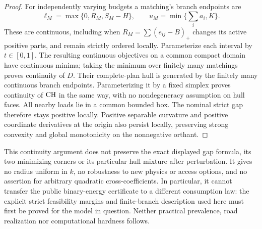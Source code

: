 \begin{proof}
For independently varying budgets a matching's branch endpoints are
\[
 \ell_M=\max\{0,R_M,S_M-H\},\qquad
 u_M=\min\{\textstyle\sum_i a_i,K\}.
\]
These are continuous, including when
$R_M=\sum(e_{ij}-B)_+$ changes its active positive parts, and remain
strictly ordered locally. Parameterize each interval by $t\in[0,1]$.
The resulting continuous objectives on a common compact domain have
continuous minima; taking the minimum over finitely many matchings
proves continuity of $D$. Their complete-plan hull is generated by the
finitely many continuous branch endpoints. Parameterizing it by a fixed
simplex proves continuity of $\mathrm{CH}$ in the same way, with no
nondegeneracy assumption on hull faces. All nearby loads lie in a common
bounded box. The nominal strict gap therefore stays positive locally.
Positive separable curvature and positive coordinate derivatives at the
origin also persist locally, preserving strong convexity and global
monotonicity on the nonnegative orthant.
\end{proof}

This continuity argument does not preserve the exact displayed gap
formula, its two minimizing corners or its particular hull mixture after
perturbation. It gives no radius uniform in $k$, no robustness to new
physics or access options, and no assertion for arbitrary quadratic
cross-coefficients. In particular, it cannot transfer the public
binary-energy certificate to a different consumption law: the explicit
strict feasibility margins and finite-branch description used here must
first be proved for the model in question. Neither practical prevalence,
road realization nor computational hardness follows.
